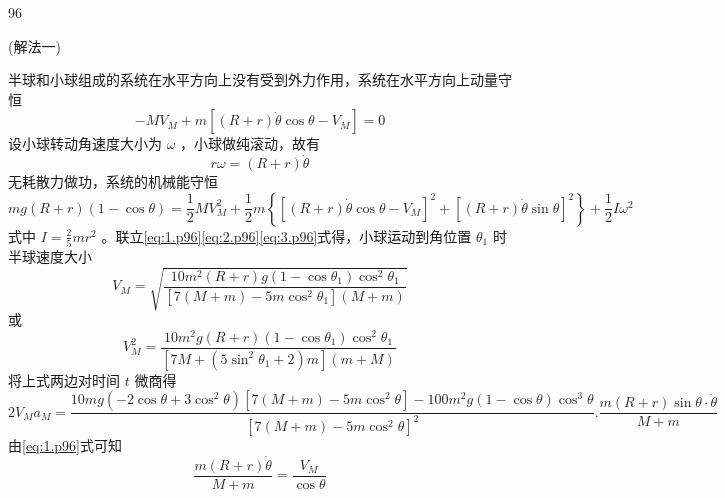 \begin{solution}{96}
    \begin{subsolution}
        (解法一)

        半球和小球组成的系统在水平方向上没有受到外力作用，系统在水平方向上动量守恒
        \begin{equation}
            - M V _ {M} + m [ (R + r) \dot {\theta} \cos \theta - V _ {M} ] = 0
            \label{eq:1.p96}
        \end{equation}
        设小球转动角速度大小为 $\omega$ ，小球做纯滚动，故有
        \begin{equation}
            r \omega = (R + r) \dot {\theta}
            \label{eq:2.p96}
        \end{equation}
        无耗散力做功，系统的机械能守恒
        \begin{equation}
            m g (R + r) (1 - \cos \theta)
            = \frac {1}{2} M V _ {M} ^ {2} + \frac {1}{2} m \left\{\left[ (R + r) \dot {\theta} \cos \theta - V _ {M} \right] ^ {2} + \left[ (R + r) \dot {\theta} \sin \theta \right] ^ {2} \right\} + \frac {1}{2} I \omega^ {2}
            \label{eq:3.p96}
        \end{equation}
        式中 $I=\frac{2}{5}mr^{2}$ 。联立\eqref{eq:1.p96}\eqref{eq:2.p96}\eqref{eq:3.p96}式得，小球运动到角位置 $\theta_{1}$ 时半球速度大小
        \begin{equation}
            V _ {M} = \sqrt {\frac {1 0 m ^ {2} (R + r) g (1 - \cos \theta_ {1}) \cos^ {2} \theta_ {1}}{\left[ 7 (M + m) - 5 m \cos^ {2} \theta_ {1} \right] (M + m)}}
            \label{eq:4.p96}
        \end{equation}
        或
        \begin{equation*}
            V _ {M} ^ {2} = \frac {1 0 m ^ {2} g (R + r) \left(1 - \cos \theta_ {1}\right) \cos^ {2} \theta_ {1}}{\left[ 7 M + \left(5 \sin^ {2} \theta_ {1} + 2\right) m \right] (m + M)}
        \end{equation*}
        将上式两边对时间 $t$ 微商得
        \begin{equation*}
            2 V _ {M} a _ {M} = \frac {1 0 m g (- 2 \cos \theta + 3 \cos^ {2} \theta) [ 7 (M + m) - 5 m \cos^ {2} \theta ] - 1 0 0 m ^ {2} g (1 - \cos \theta) \cos^ {3} \theta}{[ 7 (M + m) - 5 m \cos^ {2} \theta ] ^ {2}}. \frac {m (R + r) \sin \theta \cdot \dot {\theta}}{M + m}
        \end{equation*}
        由\eqref{eq:1.p96}式可知
        \begin{equation*}
            \frac {m (R + r) \dot {\theta}}{M + m} = \frac {V _ {M}}{\cos \theta}

\end{equation*}
\end{subsolution}
\end{solution}
